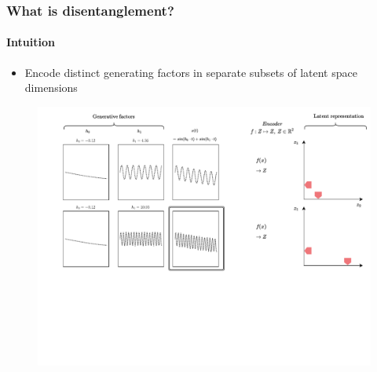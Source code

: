 \documentclass[9pt]{beamer}
\begin{document}
\begin{frame}
\frametitle{What is disentanglement?}
\framesubtitle{Intuition}
\begin{itemize}%
	\item Encode distinct generating factors in separate subsets of latent space dimensions
\end{itemize}
\begin{figure}
	\includegraphics[width=.93\linewidth]{figures/intution_3x3_2.pdf}
\end{figure}
\end{frame} 
\end{document}

